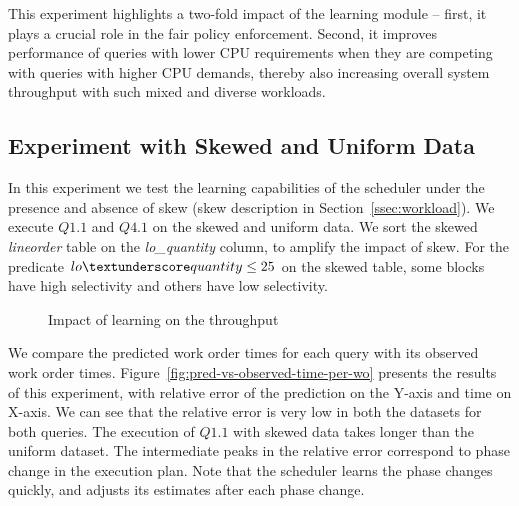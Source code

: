 This experiment highlights a two-fold impact of the learning module -- first, it plays a crucial role in the fair policy enforcement. 
Second, it improves performance of queries with lower CPU requirements when they are competing with queries with higher CPU demands, thereby also increasing overall system throughput with such mixed and diverse workloads. 

\subsection{Experiment with Skewed and Uniform Data}
In this experiment we test the learning capabilities of the \sys{} scheduler under the presence and absence of skew (skew description in Section~\ref{ssec:workload}).
We execute $Q1.1$ and $Q4.1$ on the skewed and uniform data.
We sort the skewed \textit{lineorder} table on the \textit{lo\_quantity} column, to amplify the impact of skew. 
For the predicate $lo\textunderscore quantity \leq 25$ on the skewed table, some blocks have high selectivity and others have low selectivity.

\begin{figure}[t]
	\centering
	\vspace{-0.6em}
	\caption{Impact of learning on the throughput}
	\label{fig:q11-q41-throughput}
	\vspace{-1.2em}
\end{figure}
	
We compare the predicted work order times for each query with its observed work order times. %
Figure~\ref{fig:pred-vs-observed-time-per-wo} presents the results of this experiment, with relative error of the prediction on the Y-axis and time on X-axis.
We can see that the relative error is very low in both the datasets for both queries. 
The execution of $Q1.1$ with skewed data takes longer than the uniform dataset.
The intermediate peaks in the relative error correspond to phase change in the execution plan. 
Note that the scheduler learns the phase changes quickly, and adjusts its estimates after each phase change. 

